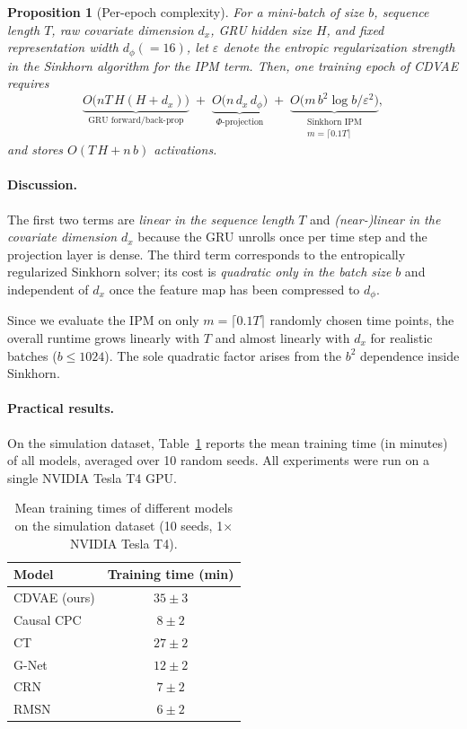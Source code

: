 \documentclass[10pt]{article} %
\newtheorem{proposition}[theorem]{Proposition}
\begin{document}
\begin{proposition}[Per-epoch complexity]
For a mini-batch of size $b$, sequence length $T$, raw covariate dimension $d_x$, GRU hidden size $H$, 
and fixed representation width $d_\phi (=16)$, let $\varepsilon$ denote the entropic regularization strength in the Sinkhorn algorithm for the IPM term. 
Then, one training epoch of CDVAE requires
\[
\underbrace{O\!\bigl(nT\,H(H+d_x)\bigr)}_{\text{GRU forward/back-prop}}
\;+\;
\underbrace{O\!\bigl(n\,d_x\,d_\phi\bigr)}_{\Phi\text{-projection}}
\;+\;
\underbrace{O\!\bigl(m\,b^{2}\log b/\varepsilon^{2}\bigr)}_{\substack{\text{Sinkhorn IPM}\\ m=\lceil 0.1T \rceil}},
\]
and stores $O(T\,H+n\,b)$ activations.
\end{proposition}

\paragraph{Discussion.}
The first two terms are \emph{linear in the sequence length} $T$ and \emph{(near-)linear in the covariate dimension} $d_x$ 
because the GRU unrolls once per time step and the projection layer is dense. 
The third term corresponds to the entropically regularized Sinkhorn solver; 
its cost is \emph{quadratic only in the batch size} $b$ and independent of $d_x$ once the feature map has been compressed to $d_\phi$. 

Since we evaluate the IPM on only $m = \lceil 0.1T \rceil$ randomly chosen time points, 
the overall runtime grows linearly with $T$ and almost linearly with $d_x$ for realistic batches ($b \leq 1024$). 
The sole quadratic factor arises from the $b^2$ dependence inside Sinkhorn.

\paragraph{Practical results.}
On the simulation dataset, Table~\ref{tab:training-times} reports the mean training time (in minutes) of all models, 
averaged over 10 random seeds. 
All experiments were run on a single NVIDIA Tesla T4 GPU.

\begin{table}[h!]
\centering
\begin{tabular}{l c}
\toprule
\textbf{Model} & \textbf{Training time (min)} \\
\midrule
CDVAE (ours)   & $35 \pm 3$ \\
Causal CPC     & $8 \pm 2$ \\
CT             & $27 \pm 2$ \\
G-Net          & $12 \pm 2$ \\
CRN            & $7 \pm 2$ \\
RMSN           & $6 \pm 2$ \\
\bottomrule
\end{tabular}
\caption{Mean training times of different models on the simulation dataset (10 seeds, 1$\times$ NVIDIA Tesla T4).}
\label{tab:training-times}
\end{table}
\end{document}
